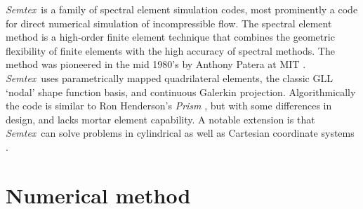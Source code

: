 \documentclass[11pt,a4paper]{report}
\newcommand{\Semtex}{\emph{Semtex}}
\begin{document}
\Semtex\ is a family of spectral element simulation codes, most
prominently a code for direct numerical simulation of incompressible
flow.  The spectral element method is a high-order finite element
technique that combines the geometric flexibility of finite elements
with the high accuracy of spectral methods.  The method was pioneered
in the mid 1980's by Anthony Patera at MIT
\citep{pat84,kp86}. \Semtex\ uses parametrically mapped quadrilateral
elements, the classic GLL `nodal' shape function basis, and continuous
Galerkin projection.  Algorithmically the code is similar to Ron
Henderson's \emph{Prism} \citep{hk95,kh98,hen99b}, but with some
differences in design, and lacks mortar element capability. A notable
extension is that \Semtex\ can solve problems in cylindrical as well
as Cartesian coordinate systems \citep{blsh04}.

\section{Numerical method}
\end{document}
